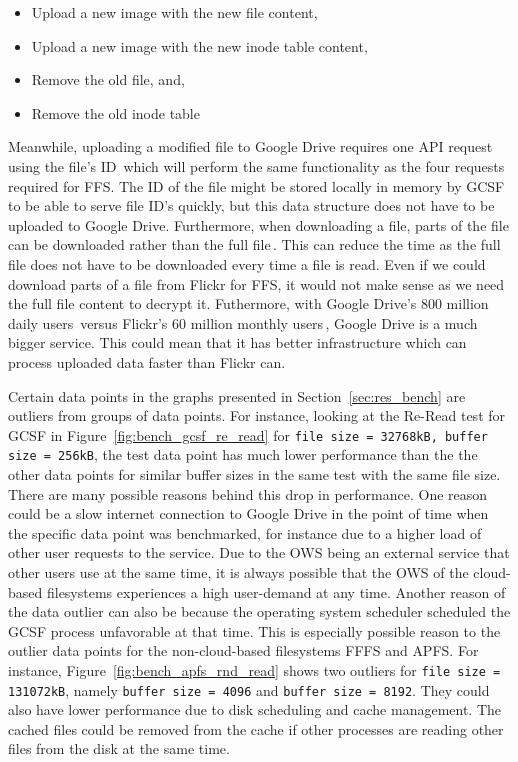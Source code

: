 \begin{itemize}
	\item Upload a new image with the new file content,
	\item Upload a new image with the new inode table content,
	\item Remove the old file, and,
	\item Remove the old inode table
\end{itemize}
Meanwhile, uploading a modified file to Google Drive requires one API request using the file's ID\,\cite{FilesUpdateDrive2022} which will perform the same functionality as the four requests required for \gls{FFS}. The ID of the file might be stored locally in memory by \gls{GCSF} to be able to serve file ID's quickly, but this data structure does not have to be uploaded to Google Drive. Furthermore, when downloading a file, parts of the file can be downloaded rather than the full file\,\cite{googleDownloadFilesDrive2022}. This can reduce the time as the full file does not have to be downloaded every time a file is read. Even if we could download parts of a file from Flickr for \gls{FFS}, it would not make sense as we need the full file content to decrypt it. Futhermore, with Google Drive's 800 million daily users\,\cite{lardinoisGoogleUpdatesDrive2017} versus Flickr's 60 million monthly users\,\cite{campbellFlickrStatistics20222022}, Google Drive is a much bigger service. This could mean that it has better infrastructure which can process uploaded data faster than Flickr can.

Certain data points in the graphs presented in Section~\ref{sec:res_bench} are outliers from groups of data points. For instance, looking at the \mbox{Re-Read} test for \gls{GCSF} in Figure~\ref{fig:bench_gcsf_re_read} for \texttt{file size = 32768kB, buffer size = 256kB}, the test data point has much lower performance than the the other data points for similar buffer sizes in the same test with the same file size. There are many possible reasons behind this drop in performance. One reason could be a slow internet connection to Google Drive in the point of time when the specific data point was benchmarked, for instance due to a higher load of other user requests to the service. Due to the \gls{OWS} being an external service that other users use at the same time, it is always possible that the \gls{OWS} of the \mbox{cloud-based} filesystems experiences a high \mbox{user-demand} at any time. Another reason of the data outlier can also be because the operating system scheduler scheduled the \gls{GCSF} process unfavorable at that time. This is especially possible reason to the outlier data points for the \mbox{non-cloud-based} filesystems \gls{FFFS} and \gls{APFS}. For instance, Figure~\ref{fig:bench_apfs_rnd_read} shows two outliers for \texttt{file size = 131072kB}, namely \texttt{buffer size = 4096} and \texttt{buffer size = 8192}. They could also have lower performance due to disk scheduling and cache management. The cached files could be removed from the cache if other processes are reading other files from the disk at the same time.


